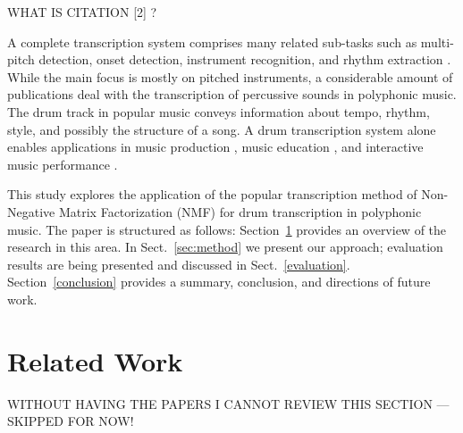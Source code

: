 \documentclass{article}
\begin{document}
WHAT IS CITATION [2] ?

A complete transcription system comprises many related sub-tasks such as multi-pitch detection, onset detection, instrument recognition, and rhythm extraction \cite{1}. While the main focus is mostly on pitched instruments, a considerable amount of publications deal with the transcription of percussive sounds in polyphonic music. The drum track in popular music conveys information about tempo, rhythm, style, and possibly the structure of a song. A drum transcription system alone enables applications in music production \cite{3,4}, music education \cite{I DONT KNOW}, and interactive music performance \cite{5}.


This study explores the application of the popular transcription method of Non-Negative Matrix Factorization (NMF) for drum transcription in polyphonic music. The paper is structured as follows: Section~\ref{sec:related works} provides an overview of the research in this area. In Sect.~\ref{sec:method} we present our approach; evaluation results are being presented and discussed in Sect.~\ref{evaluation}. Section~\ref{conclusion} provides a summary, conclusion, and directions of future work.


\section{Related Work}\label{sec:related works}
WITHOUT HAVING THE PAPERS I CANNOT REVIEW THIS SECTION --- SKIPPED FOR NOW!
\end{document}
